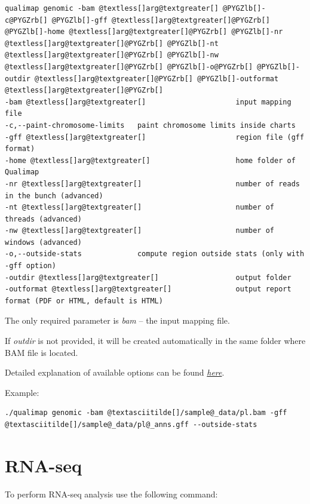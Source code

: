\documentclass[a4paper,10pt,english]{sphinxmanual}
\begin{document}
\begin{Verbatim}[commandchars=@\[\]]
qualimap genomic -bam @textless[]arg@textgreater[] @PYGZlb[]-c@PYGZrb[] @PYGZlb[]-gff @textless[]arg@textgreater[]@PYGZrb[] @PYGZlb[]-home @textless[]arg@textgreater[]@PYGZrb[] @PYGZlb[]-nr @textless[]arg@textgreater[]@PYGZrb[] @PYGZlb[]-nt @textless[]arg@textgreater[]@PYGZrb[] @PYGZlb[]-nw @textless[]arg@textgreater[]@PYGZrb[] @PYGZlb[]-o@PYGZrb[] @PYGZlb[]-outdir @textless[]arg@textgreater[]@PYGZrb[] @PYGZlb[]-outformat @textless[]arg@textgreater[]@PYGZrb[]
-bam @textless[]arg@textgreater[]                     input mapping file
-c,--paint-chromosome-limits   paint chromosome limits inside charts
-gff @textless[]arg@textgreater[]                     region file (gff format)
-home @textless[]arg@textgreater[]                    home folder of Qualimap
-nr @textless[]arg@textgreater[]                      number of reads in the bunch (advanced)
-nt @textless[]arg@textgreater[]                      number of threads (advanced)
-nw @textless[]arg@textgreater[]                      number of windows (advanced)
-o,--outside-stats             compute region outside stats (only with -gff option)
-outdir @textless[]arg@textgreater[]                  output folder
-outformat @textless[]arg@textgreater[]               output report format (PDF or HTML, default is HTML)
\end{Verbatim}

\begin{DUlineblock}{0em}
\item[] 
\item[] The only required parameter is \emph{bam} -- the input mapping file.
\item[] If \emph{outdir} is not provided, it will be created automatically in the same folder where BAM file is located.
\item[] 
\item[] Detailed explanation of available options can be found {\hyperref[analysis:genomic]{\emph{here}}}.
\end{DUlineblock}

Example:

\begin{Verbatim}[commandchars=@\[\]]
./qualimap genomic -bam @textasciitilde[]/sample@_data/pl.bam -gff @textasciitilde[]/sample@_data/pl@_anns.gff --outside-stats
\end{Verbatim}


\section{RNA-seq}
\label{command_line:cmdline-rnaseq}\label{command_line:rna-seq}
To perform RNA-seq analysis use the following command:
\end{document}

